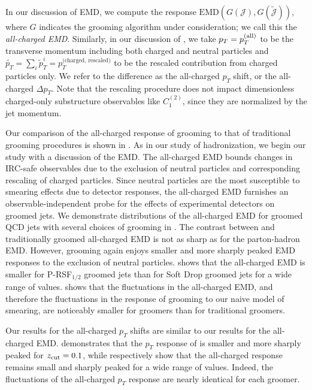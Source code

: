 In our discussion of EMD, we compute the response \(\text{EMD}\left(G(\mathcal{J}), G(\tilde{\mathcal{J}})\right)\), where \(G\) indicates the grooming algorithm under consideration;
%
we call this the \textit{all-charged EMD}.
%
Similarly, in our discussion of , we take \(p_T = p_T^{\rm(all)}\) to be the transverse momentum including both charged and neutral particles and \(\widetilde{p_T} = \sum_i \tilde p_T^i = p_T^{\text{(charged, rescaled)}}\) to be the rescaled contribution from charged particles only.
%
We refer to the difference as the all-charged \(p_T\) shift, or the all-charged \(\Delta p_T\).
%
Note that the rescaling procedure does not impact dimensionless charged-only substructure observables like \(C_1^{(2)}\), since they are normalized by the jet momentum.


Our comparison of the all-charged response of \PIRANHA{} grooming to that of traditional grooming procedures is shown in .
%
As in our study of \gls{hadronization}, we begin our study with a discussion of the EMD.
%
The all-charged EMD bounds changes in IRC-safe observables due to the exclusion of neutral particles and corresponding rescaling of charged particles.
%
Since neutral particles are the most susceptible to smearing effects due to detector responses, the all-charged EMD furnishes an observable-independent probe for the effects of experimental detectors on groomed jets.
%
We demonstrate distributions of the all-charged EMD for groomed QCD jets with several choices of grooming in .
%
The contrast between \PIRANHA{} and traditionally groomed all-charged EMD is not as sharp as for the parton-hadron EMD.
%
However, \PIRANHA{} grooming again enjoys smaller and more sharply peaked EMD responses to the exclusion of neutral particles.
%
 shows that the all-charged EMD is smaller for P-RSF\(_{1/2}\) groomed jets than for Soft Drop groomed jets for a wide range of \zcut{} values.
%
 shows that the fluctuations in the all-charged EMD, and therefore the fluctuations in the response of grooming to our naive model of smearing, are noticeably smaller for \PIRANHA{} groomers than for traditional groomers.

Our results for the all-charged \(p_T\) shifts are similar to our results for the all-charged EMD.
%
 demonstrates that the \(p_T\) response of  is smaller and more sharply peaked for $z_{\rm cut} = 0.1$, while  respectively show that the  all-charged response remains small and sharply peaked for a wide range of \zcut{} values.
%
Indeed, the fluctuations of the all-charged \(p_T\) response are nearly identical for each \PIRANHA{} groomer.

